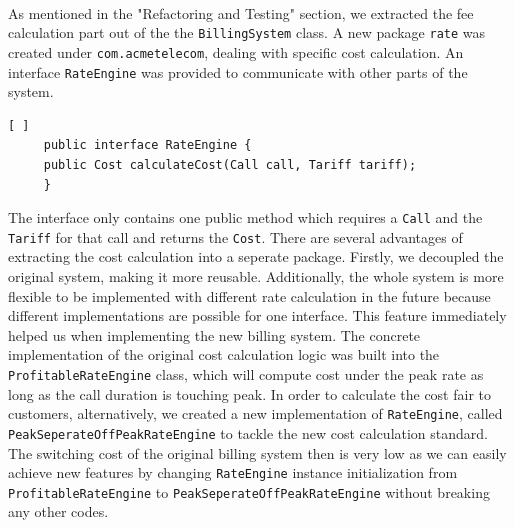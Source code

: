 \documentclass[a4paper,12pt,oneside,final]{article}
\begin{document}
\paragraph{}
As mentioned in the "Refactoring and Testing" section, we extracted the fee calculation part out of the the \verb+BillingSystem+ class. A new package \verb+rate+ was created under \verb+com.acmetelecom+, dealing with specific cost calculation. An interface \verb+RateEngine+ was provided to communicate with other parts of the system. 
\begin{lstlisting}[ ]
     public interface RateEngine {
   	 public Cost calculateCost(Call call, Tariff tariff);
     }
\end{lstlisting}
The interface only contains one public method which requires a \verb+Call+ and the \verb+Tariff+ for that call and returns the \verb+Cost+.  There are several advantages of extracting the cost calculation into a seperate package. Firstly, we decoupled the original system, making it more reusable. Additionally, the whole system is more flexible to be implemented with different rate calculation in the future because different implementations are possible for one interface. This feature immediately helped us when implementing the new billing system. The concrete implementation of the original cost calculation logic was built into the \verb+ProfitableRateEngine+ class, which will compute cost under the peak rate as long as the call duration is touching peak. In order to calculate the cost fair to customers, alternatively, we created a new implementation of \verb+RateEngine+, called \verb+PeakSeperateOffPeakRateEngine+ to tackle the new cost calculation standard. The switching cost of the original billing system then is very low as we can easily achieve new features by changing \verb+RateEngine+ instance initialization from \verb+ProfitableRateEngine+ to \verb+PeakSeperateOffPeakRateEngine+ without breaking any other codes.
\end{document}

